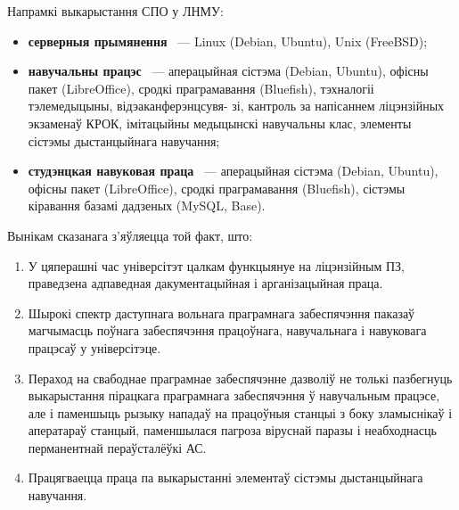 \documentclass[10pt, a5paper]{article}
\begin{document}
Напрамкі выкарыстання СПО у ЛНМУ:

\begin{itemize}
  \item \textbf{серверныя прымянення} ~--- Linux  (Debian, Ubuntu), Unix (FreeBSD);
  \item \textbf{навучальны працэс} ~--- аперацыйная сістэма \linebreak(Debian,  Ubuntu), офісны пакет (LibreOffice), сродкі праграмавання \linebreak (Bluefish), тэхналогіі тэлемедыцыны, відэаканферэнцсувя-
зі, кантроль за напісаннем ліцэнзійных экзаменаў КРОК, імітацыйны медыцынскі навучальны клас, элементы сістэмы дыстанцыйнага навучання;
  \item \textbf{студэнцкая навуковая праца} ~--- аперацыйная сістэма \linebreak  (Debian, Ubuntu), офісны пакет (LibreOffice), сродкі праграмавання \linebreak (Bluefish), сістэмы кіравання базамі дадзеных (MySQL, Base).
\end{itemize}

Вынікам сказанага з'яўляецца той факт, што:

\begin{enumerate}
  \item У цяперашні час універсітэт цалкам функцыянуе на ліцэнзійным ПЗ, праведзена адпаведная дакументацыйная і арганізацыйная праца.
  \item Шырокі спектр даступнага вольнага праграмнага забеспячэння паказаў магчымасць поўнага забеспячэння працоўнага, навучальнага і навуковага працэсаў у універсітэце.
  \item Пераход на свабоднае праграмнае забеспячэнне дазволіў не толькі пазбегнуць выкарыстання пірацкага праграмнага забеспячэння ў навучальным працэсе, але і паменшыць рызыку нападаў на працоўныя станцыі з боку зламыснікаў і аператараў станцый, паменшылася пагроза віруснай паразы і неабходнасць перманентнай пераўсталёўкі АС.
  \item Працягваецца праца па выкарыстанні элементаў сістэмы дыстанцыйнага навучання.
\end{enumerate}
\end{document}
